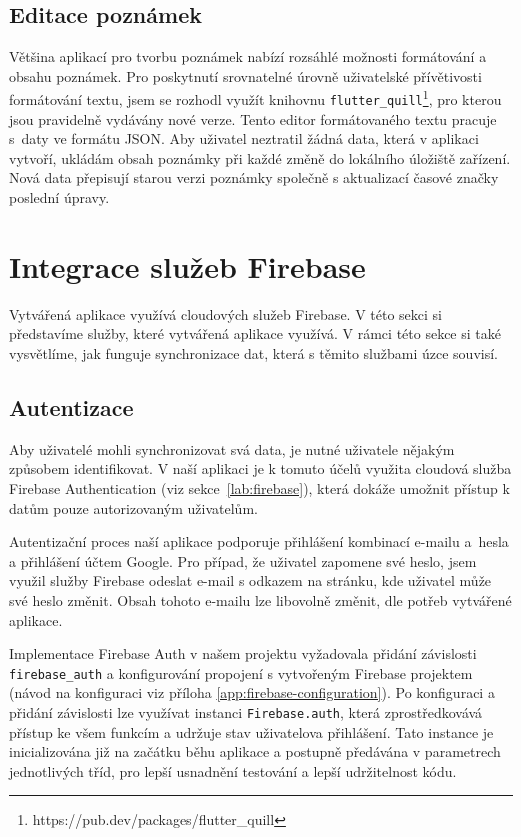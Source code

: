 \documentclass[czech, bc, kiv, he, iso690numb]{fasthesis}
\begin{document}
\subsection{Editace poznámek}

Většina aplikací pro tvorbu poznámek nabízí rozsáhlé možnosti formátování a obsahu poznámek. Pro poskytnutí srovnatelné úrovně uživatelské přívětivosti formátování textu, jsem se rozhodl využít knihovnu \texttt{flutter\_quill}\footnote{https://pub.dev/packages/flutter\_quill}, pro kterou jsou pravidelně vydávány nové verze. Tento editor formátovaného textu pracuje s~daty ve formátu \gls{JSON}. Aby uživatel neztratil žádná data, která v aplikaci vytvoří, ukládám obsah poznámky při každé změně do lokálního úložiště zařízení. Nová data přepisují starou verzi poznámky společně s aktualizací časové značky poslední úpravy. 

\section{Integrace služeb Firebase}

Vytvářená aplikace využívá cloudových služeb Firebase. V této sekci si představíme služby, které vytvářená aplikace využívá. V rámci této sekce si také vysvětlíme, jak funguje synchronizace dat, která s těmito službami úzce souvisí.

\subsection{Autentizace}

Aby uživatelé mohli synchronizovat svá data, je nutné uživatele nějakým způsobem identifikovat. V naší aplikaci je k tomuto účelů využita cloudová služba Firebase Authentication (viz sekce~\ref{lab:firebase}), která dokáže umožnit přístup k datům pouze autorizovaným uživatelům.

Autentizační proces naší aplikace podporuje přihlášení kombinací e-mailu a~hesla a přihlášení účtem Google. Pro případ, že uživatel zapomene své heslo, jsem využil služby Firebase odeslat e-mail s odkazem na stránku, kde uživatel může své heslo změnit. Obsah tohoto e-mailu lze libovolně změnit, dle potřeb vytvářené aplikace. 

Implementace Firebase Auth v našem projektu vyžadovala přidání závislosti \texttt{firebase\_auth} a konfigurování propojení s vytvořeným Firebase projektem (návod na konfiguraci viz příloha \ref{app:firebase-configuration}). Po konfiguraci a přidání závislosti lze využívat instanci \texttt{Firebase.auth}, která zprostředkovává přístup ke všem funkcím a udržuje stav uživatelova přihlášení. Tato instance je inicializována již na začátku běhu aplikace a postupně předávána v parametrech jednotlivých tříd, pro lepší usnadnění testování a lepší udržitelnost kódu. 
\end{document}
